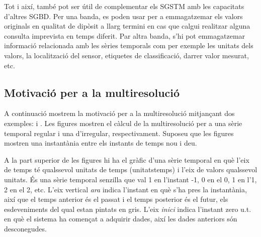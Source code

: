 Tot i així, també pot ser útil de complementar els \gls{SGSTM} amb les
capacitats d'altres \gls{SGBD}. Per una banda, es poden usar per a
emmagatzemar els valors originals en qualitat de dipòsit a llarg
termini en cas que calgui realitzar alguna consulta imprevista en
temps diferit.  Par altra banda, s'hi pot emmagatzemar
informació relacionada amb les sèries temporals com per exemple les
unitats dels valors, la localització del sensor, etiquetes de
classificació, darrer valor mesurat, etc.












\subsection{Motivació per a la multiresolució}


A continuació mostrem la motivació per a la multiresolució mitjançant
dos exemples:  i
. Les figures
mostren el càlcul de la multiresolució per a una sèrie temporal
regular i una d'irregular, respectivament.  Suposeu que les figures
mostren una instantània entre els instants de temps nou i deu.


A la part superior de les figures hi ha el gràfic d'una sèrie temporal
en què l'eix de temps té qualssevol unitats de temps
(\gls{unitatstemps}) i l'eix de valors qualssevol unitats. És una
sèrie temporal senzilla que val 1 en l'instant -1, 0 en el 0, 1 en
l'1, 2 en el 2, etc.  L'eix vertical \emph{ara} indica l'instant en
què s'ha pres la instantània, així que el temps anterior és el passat
i el temps posterior és el futur, els esdeveniments del qual estan
pintats en gris. L'eix \emph{inici} indica l'instant zero u.t. en què
el sistema ha començat a adquirir dades, així les dades anteriors són
desconegudes.


